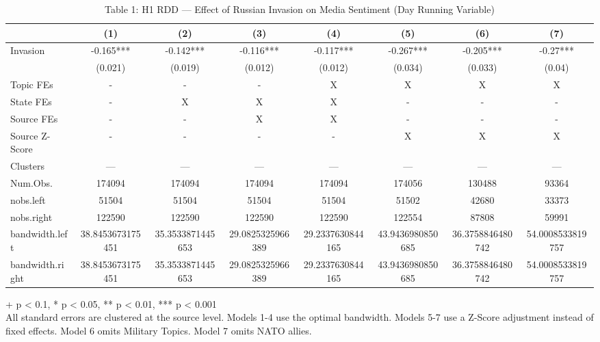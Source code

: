 \begin{table}[t]
\caption{\label{tab:table-01}Table 1: H1 RDD — Effect of Russian Invasion on Media Sentiment (Day Running Variable)} 
\fontsize{12.0pt}{14.0pt}\selectfont
\begin{tabular*}{\linewidth}{@{\extracolsep{\fill}}lccccccc}
\toprule
  & (1) & (2) & (3) & (4) & (5) & (6) & (7) \\ 
\midrule\addlinespace[2.5pt]
Invasion & -0.165*** & -0.142*** & -0.116*** & -0.117*** & -0.267*** & -0.205*** & -0.27*** \\ 
{} & {(0.021)} & {(0.019)} & {(0.012)} & {(0.012)} & {(0.034)} & {(0.033)} & {(0.04)} \\ 
Topic FEs & - & - & - & X & X & X & X \\ 
State FEs & - & X & X & X & - & - & - \\ 
Source FEs & - & - & X & X & - & - & - \\ 
Source Z-Score & - & - & - & - & X & X & X \\ 
Clusters & — & — & — & — & — & — & — \\ 
Num.Obs. & 174094 & 174094 & 174094 & 174094 & 174056 & 130488 & 93364 \\ 
nobs.left & 51504 & 51504 & 51504 & 51504 & 51502 & 42680 & 33373 \\ 
nobs.right & 122590 & 122590 & 122590 & 122590 & 122554 & 87808 & 59991 \\ 
bandwidth.left & 38.8453673175451 & 35.3533871445653 & 29.0825325966389 & 29.2337630844165 & 43.9436980850685 & 36.3758846480742 & 54.0008533819757 \\ 
bandwidth.right & 38.8453673175451 & 35.3533871445653 & 29.0825325966389 & 29.2337630844165 & 43.9436980850685 & 36.3758846480742 & 54.0008533819757 \\ 
\bottomrule
\end{tabular*}
\begin{minipage}{\linewidth}
\vspace{.05em}
+ p < 0.1, * p < 0.05, ** p < 0.01, *** p < 0.001\\
All standard errors are clustered at the source level. Models 1-4 use the
optimal bandwidth. Models 5-7 use a Z-Score adjustment instead of fixed effects.
Model 6 omits Military Topics. Model 7 omits NATO allies.\\
\end{minipage}
\end{table}

